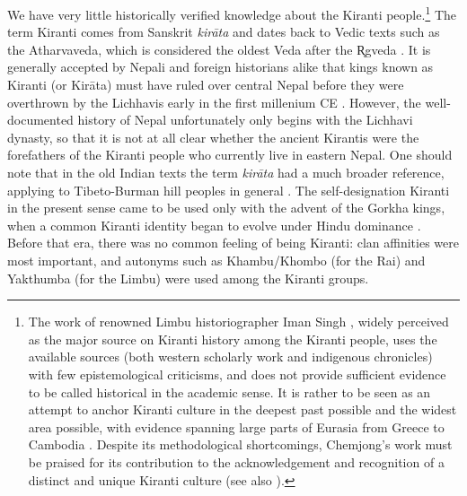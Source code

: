 We have very little historically verified knowledge about the Kiranti people.\footnote{The work of renowned Limbu historiographer Iman Singh \citet{Chemjong1967History}, widely perceived as the major source on Kiranti history among the Kiranti people, uses the available sources (both western scholarly work and indigenous chronicles) with few epistemological criticisms, and does not provide sufficient evidence to be called historical in the academic sense. It is rather to be seen as an attempt to anchor Kiranti culture in the deepest past possible and the widest  area possible, with  evidence spanning large parts of Eurasia from Greece to Cambodia \citep[125]{Schlemmer2003_New}. Despite its methodological shortcomings, Chemjong's work must be praised for its contribution to the acknowledgement and recognition of a distinct and unique Kiranti culture (see also \citealt[340]{Gaenszle2002_Remaking}).} The term Kiranti comes from Sanskrit \emph{kirāta} and dates back to Vedic texts such as the Atharvaveda, which is considered the oldest Veda after the   R̥gveda \citep[594]{Driem2001Languages}. It is generally accepted by Nepali and foreign historians alike that kings known as Kiranti (or Kirāta) must have ruled over central Nepal before they were overthrown by the Lichhavis early in the first millenium CE \citep[13]{Whelpton2005A-History}.  However, the well-documented history of Nepal unfortunately only begins with the Lichhavi dynasty, so that it is not at all clear whether the ancient Kirantis were the forefathers of the Kiranti people who currently live in eastern Nepal. One should note that in  the old Indian texts the term \emph{kirāta} had a much broader reference, applying to Tibeto-Burman hill peoples in general \citep{Whelpton2005A-History, Schlemmer2003_New}. The self-designation Kiranti in the present sense came to be used only with the advent of the Gorkha kings, when a common Kiranti identity began to evolve under Hindu dominance \citep[340]{Gaenszle2002_Remaking}. Before that era, there was no common feeling of being Kiranti: clan affinities were most important, and autonyms such as Khambu/Khombo (for the Rai) and Yakthumba (for the Limbu) were used among the Kiranti groups.


